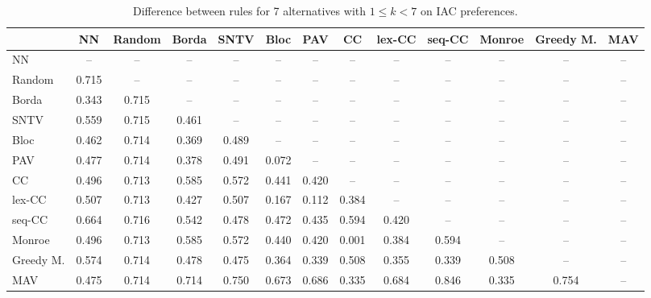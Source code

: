 
\begin{table*}[h!]
\centering
\begin{tabular}{lcccccccccccc}
\toprule
 & NN & Random & Borda & SNTV & Bloc & PAV & CC & lex-CC & seq-CC & Monroe & Greedy M. & MAV \\
\midrule
NN & -- & -- & -- & -- & -- & -- & -- & -- & -- & -- & -- & -- \\
Random & 0.715 & -- & -- & -- & -- & -- & -- & -- & -- & -- & -- & -- \\
Borda & 0.343 & 0.715 & -- & -- & -- & -- & -- & -- & -- & -- & -- & -- \\
SNTV & 0.559 & 0.715 & 0.461 & -- & -- & -- & -- & -- & -- & -- & -- & -- \\
Bloc & 0.462 & 0.714 & 0.369 & 0.489 & -- & -- & -- & -- & -- & -- & -- & -- \\
PAV & 0.477 & 0.714 & 0.378 & 0.491 & 0.072 & -- & -- & -- & -- & -- & -- & -- \\
CC & 0.496 & 0.713 & 0.585 & 0.572 & 0.441 & 0.420 & -- & -- & -- & -- & -- & -- \\
lex-CC & 0.507 & 0.713 & 0.427 & 0.507 & 0.167 & 0.112 & 0.384 & -- & -- & -- & -- & -- \\
seq-CC & 0.664 & 0.716 & 0.542 & 0.478 & 0.472 & 0.435 & 0.594 & 0.420 & -- & -- & -- & -- \\
Monroe & 0.496 & 0.713 & 0.585 & 0.572 & 0.440 & 0.420 & 0.001 & 0.384 & 0.594 & -- & -- & -- \\
Greedy M. & 0.574 & 0.714 & 0.478 & 0.475 & 0.364 & 0.339 & 0.508 & 0.355 & 0.339 & 0.508 & -- & -- \\
MAV & 0.475 & 0.714 & 0.714 & 0.750 & 0.673 & 0.686 & 0.335 & 0.684 & 0.846 & 0.335 & 0.754 & -- \\
\bottomrule
\end{tabular}

\caption{Difference between rules for 7 alternatives with $1 \leq k < 7$ on IAC preferences.}
\end{table*}
